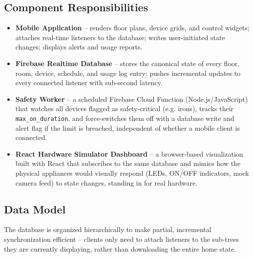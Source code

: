 \documentclass[11pt,a4paper]{article}
\begin{document}
\subsection{Component Responsibilities}
\begin{itemize}
    \item \textbf{Mobile Application} -- renders floor plans, device grids, and control widgets; attaches real-time listeners to the database; writes user-initiated state changes; displays alerts and usage reports.
    \item \textbf{Firebase Realtime Database} -- stores the canonical state of every floor, room, device, schedule, and usage log entry; pushes incremental updates to every connected listener with sub-second latency.
    \item \textbf{Safety Worker} -- a scheduled Firebase Cloud Function (Node.js/JavaScript) that watches all devices flagged as safety-critical (e.g. irons), tracks their \texttt{max\_on\_duration}, and force-switches them off with a database write and alert flag if the limit is breached, independent of whether a mobile client is connected.
    \item \textbf{React Hardware Simulator Dashboard} -- a browser-based visualization built with React that subscribes to the same database and mimics how the physical appliances would visually respond (LEDs, ON/OFF indicators, mock camera feed) to state changes, standing in for real hardware.
\end{itemize}

\subsection{Data Model}
The database is organized hierarchically to make partial, incremental synchronization efficient -- clients only need to attach listeners to the sub-trees they are currently displaying, rather than downloading the entire home state.
\end{document}
